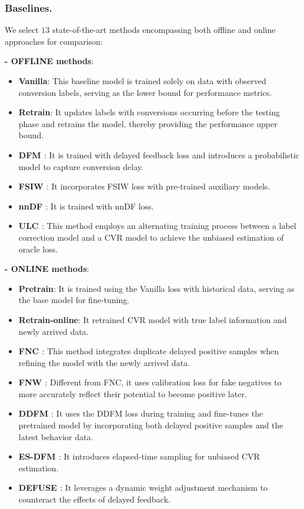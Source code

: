 \subsubsection{Baselines.}
We select $13$ state-of-the-art methods encompassing both offline and online approaches for comparison:

\noindent\textbf{- OFFLINE methods}:
\begin{itemize}[left=0pt]
    \item \textbf{Vanilla}: This baseline model is trained solely on data with observed conversion labels, serving as the lower bound for performance metrics.
    \item \textbf{Retrain}: It updates labels with conversions occurring before the testing phase and retrains the model, thereby providing the performance upper bound.
    \item \textbf{DFM \cite{chapelle2014modeling}}: It is trained with delayed feedback loss and introduces a probabilistic model to capture conversion delay.
    \item \textbf{FSIW \cite{yasui2020feedback}}: It incorporates FSIW loss with pre-trained auxiliary models.
    \item \textbf{nnDF \cite{kato2020learning}}: It is trained with  nnDF loss.
    \item \textbf{ULC \cite{wang2023unbiased}}: 
    This method employs an alternating training process between a label correction model and a CVR model to achieve the unbiased estimation of oracle loss. 
\end{itemize}

\noindent \textbf{- ONLINE methods}:
\begin{itemize}[leftmargin=*]
    \item \textbf{Pretrain}: It is trained using the Vanilla loss with historical data, serving as the base model for fine-tuning.
    \item \textbf{Retrain-online}: It retrained CVR model with true label information and newly arrived data.
    \item \textbf{FNC \cite{ktena2019addressing}}: This method integrates duplicate delayed positive samples when refining the model with the newly arrived data.
    \item \textbf{FNW \cite{ktena2019addressing}}: Different from FNC, it uses calibration loss for fake negatives to more accurately reflect their potential to become positive later.
    \item \textbf{DDFM \cite{dai2023dually}}: It uses the DDFM loss during training and fine-tunes the pretrained model by incorporating both delayed positive samples and the latest behavior data.
    \item \textbf{ES-DFM \cite{yang2021capturing}}: It introduces elapsed-time sampling for unbiased CVR estimation.
    \item \textbf{DEFUSE \cite{chen2022asymptotically}}: It leverages a dynamic weight adjustment mechanism to counteract the effects of delayed feedback.
\end{itemize}

